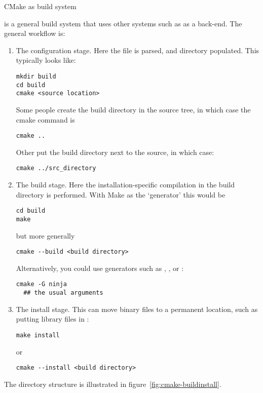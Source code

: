  {CMake as build system}

 is a general build system that uses other systems
such as  as a back-end.
The general workflow is:
\begin{enumerate}
\item The configuration stage. Here the  file
  is parsed, and  directory populated. This typically looks like:
\begin{verbatim}
mkdir build
cd build
cmake <source location>
\end{verbatim}
Some people create the build directory in the source tree,
in which case the cmake command is
\begin{verbatim}
cmake ..
\end{verbatim}
Other put the build directory next to the source, in which case:
\begin{verbatim}
cmake ../src_directory
\end{verbatim}
\item The build stage. Here the installation-specific compilation
  in the build directory is performed.
  With Make as the `generator' this would be
\begin{verbatim}
cd build
make
\end{verbatim}
but more generally
\begin{verbatim}
cmake --build <build directory>
\end{verbatim}
Alternatively, you could use generators such as ,
, or :
\begin{verbatim}
cmake -G ninja
  ## the usual arguments
\end{verbatim}
\item The install stage. This can move binary files to a permanent
  location, such as putting library files in :
\begin{verbatim}
make install
\end{verbatim}
or 
\begin{verbatim}
cmake --install <build directory>
\end{verbatim}
\end{enumerate}
The directory structure is illustrated in figure~\ref{fig:cmake-buildinstall}.


\makeatletter
\newcount\dirtree@lvl
\newcount\dirtree@plvl
\newcount\dirtree@clvl
\def\dirtree@growth{%
  \ifnum\tikznumberofcurrentchild=1\relax
  \global\advance\dirtree@plvl by 1
  \expandafter\xdef\csname dirtree@p@\the\dirtree@plvl\endcsname{\the\dirtree@lvl}
  \fi
  \global\advance\dirtree@lvl by 1\relax
  \dirtree@clvl=\dirtree@lvl
  \advance\dirtree@clvl by -\csname dirtree@p@\the\dirtree@plvl\endcsname
  \pgf@xa=1cm\relax
  \pgf@ya=-1cm\relax
  \pgf@ya=\dirtree@clvl\pgf@ya
  \pgftransformshift{\pgfqpoint{\the\pgf@xa}{\the\pgf@ya}}%
  \ifnum\tikznumberofcurrentchild=\tikznumberofchildren
  \global\advance\dirtree@plvl by -1
  \fi
}

